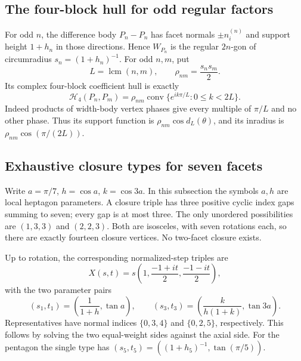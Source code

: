\documentclass[11pt,a4paper]{article}
\theoremstyle{definition}\newtheorem{definition}[theorem]{Definition}
\theoremstyle{remark}\newtheorem{remark}[theorem]{Remark}
\newcommand{\conv}{\operatorname{conv}}
\newcommand{\Hfour}{\mathcal H_4}
\begin{document}
\subsection{The four-block hull for odd regular factors}
For odd $n$, the difference body $P_n-P_n$ has facet normals $\pm n_i^{(n)}$ and support height $1+h_n$ in those directions. Hence $W_{P_n}$ is the regular $2n$-gon of circumradius $s_n=(1+h_n)^{-1}$. For odd $n,m$, put
\[
 L=\operatorname{lcm}(n,m),\qquad \rho_{nm}=\frac{s_ns_m}{2}.
\]
Its complex four-block coefficient hull is exactly
\begin{equation}\label{eq:regular-H4}
 \Hfour(P_n,P_m)=\rho_{nm}\conv\{e^{ik\pi/L}:0\le k<2L\}.
\end{equation}
Indeed products of width-body vertex phases give every multiple of $\pi/L$ and no other phase. Thus its support function is $\rho_{nm}\cos d_L(\theta)$, and its inradius is $\rho_{nm}\cos(\pi/(2L))$.

\subsection{Exhaustive closure types for seven facets}
Write $a=\pi/7$, $h=\cos a$, $k=\cos3a$. In this subsection the symbols $a,h$ are local heptagon parameters. A closure triple has three positive cyclic index gaps summing to seven; every gap is at most three. The only unordered possibilities are $(1,3,3)$ and $(2,2,3)$. Both are isosceles, with seven rotations each, so there are exactly fourteen closure vertices. No two-facet closure exists.

Up to rotation, the corresponding normalized-step triples are
\begin{equation}\label{eq:iso}
 X(s,t)=s\left(1,\frac{-1+it}{2},\frac{-1-it}{2}\right),
\end{equation}
with the two parameter pairs
\[
 (s_1,t_1)=\left(\frac1{1+h},\tan a\right),\qquad
 (s_3,t_3)=\left(\frac{k}{h(1+k)},\tan3a\right).
\]
Representatives have normal indices $\{0,3,4\}$ and $\{0,2,5\}$, respectively. This follows by solving the two equal-weight sides against the axial side. For the pentagon the single type has $(s_5,t_5)=((1+h_5)^{-1},\tan(\pi/5))$.
\end{document}
